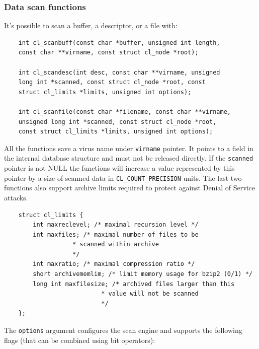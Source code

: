 \documentclass[a4paper,titlepage,12pt]{article}
\begin{document}
    \subsubsection{Data scan functions}
    It's possible to scan a buffer, a descriptor, or a file with:
    \begin{verbatim}
	int cl_scanbuff(const char *buffer, unsigned int length,
	const char **virname, const struct cl_node *root);

	int cl_scandesc(int desc, const char **virname, unsigned
	long int *scanned, const struct cl_node *root, const
	struct cl_limits *limits, unsigned int options);

	int cl_scanfile(const char *filename, const char **virname,
	unsigned long int *scanned, const struct cl_node *root,
	const struct cl_limits *limits, unsigned int options);
    \end{verbatim}
    All the functions save a virus name under \verb+virname+ pointer.
    It points to a field in the internal database structure and must not
    be released directly. If the \verb+scanned+ pointer is not NULL the
    functions will increase a value represented by this pointer by a size
    of scanned data in \verb+CL_COUNT_PRECISION+ units. The last two
    functions also support archive limits required to protect against Denial
    of Service attacks.
    \begin{verbatim}
	struct cl_limits {
	    int maxreclevel; /* maximal recursion level */
	    int maxfiles; /* maximal number of files to be
                   * scanned within archive
                   */
	    int maxratio; /* maximal compression ratio */
	    short archivememlim; /* limit memory usage for bzip2 (0/1) */
	    long int maxfilesize; /* archived files larger than this
                           * value will not be scanned
                           */
	};
    \end{verbatim}
    The \verb+options+ argument configures the scan engine and supports the
    following flags (that can be combined using bit operators):
\end{document}
